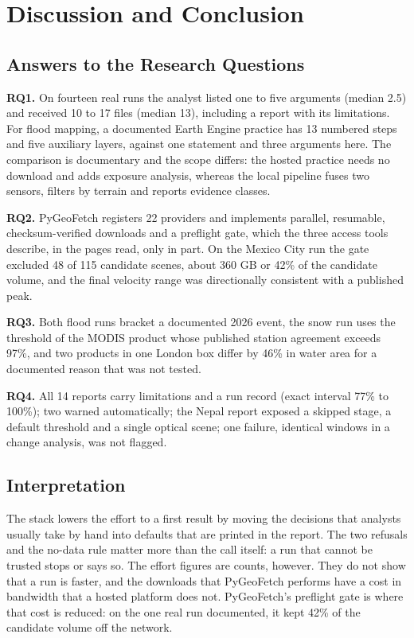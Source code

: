\documentclass[conference]{IEEEtran}
\begin{document}
\section{Discussion and Conclusion}

\subsection{Answers to the Research Questions}

\textbf{RQ1.} On fourteen real runs the analyst listed one to five arguments (median 2.5) and received 10 to 17 files (median 13), including a report with its limitations. For flood mapping, a documented Earth Engine practice has 13 numbered steps and five auxiliary layers, against one statement and three arguments here. The comparison is documentary and the scope differs: the hosted practice needs no download and adds exposure analysis, whereas the local pipeline fuses two sensors, filters by terrain and reports evidence classes.

\textbf{RQ2.} PyGeoFetch registers 22 providers and implements parallel, resumable, checksum-verified downloads and a preflight gate, which the three access tools describe, in the pages read, only in part. On the Mexico City run the gate excluded 48 of 115 candidate scenes, about 360 GB or 42\% of the candidate volume, and the final velocity range was directionally consistent with a published peak.

\textbf{RQ3.} Both flood runs bracket a documented 2026 event, the snow run uses the threshold of the MODIS product whose published station agreement exceeds 97\%, and two products in one London box differ by 46\% in water area for a documented reason that was not tested.

\textbf{RQ4.} All 14 reports carry limitations and a run record (exact interval 77\% to 100\%); two warned automatically; the Nepal report exposed a skipped stage, a default threshold and a single optical scene; one failure, identical windows in a change analysis, was not flagged.

\subsection{Interpretation}

The stack lowers the effort to a first result by moving the decisions that analysts usually take by hand into defaults that are printed in the report. The two refusals and the no-data rule matter more than the call itself: a run that cannot be trusted stops or says so. The effort figures are counts, however. They do not show that a run is faster, and the downloads that PyGeoFetch performs have a cost in bandwidth that a hosted platform does not. PyGeoFetch's preflight gate is where that cost is reduced: on the one real run documented, it kept 42\% of the candidate volume off the network.
\end{document}
